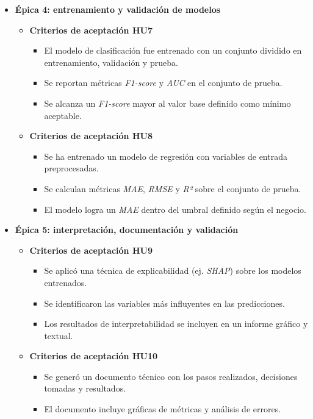 \documentclass[
11pt, %
]{charter}
\begin{document}
\begin{itemize}
  \item \textbf{Épica 4: entrenamiento y validación de modelos}
    \begin{itemize}
      \item \textbf{Criterios de aceptación HU7}
      \begin{itemize}
        \item El modelo de clasificación fue entrenado con un conjunto dividido en entrenamiento, validación y prueba.
        \item Se reportan métricas \textit{F1-score} y \textit{AUC} en el conjunto de prueba.
        \item Se alcanza un \textit{F1-score} mayor al valor base definido como mínimo aceptable.
      \end{itemize}
      \item \textbf{Criterios de aceptación HU8}
      \begin{itemize}
        \item Se ha entrenado un modelo de regresión con variables de entrada preprocesadas.
        \item Se calculan métricas \textit{MAE}, \textit{RMSE} y \textit{R²} sobre el conjunto de prueba.
        \item El modelo logra un \textit{MAE} dentro del umbral definido según el negocio.
      \end{itemize}
    \end{itemize}

  \item \textbf{Épica 5: interpretación, documentación y validación}
    \begin{itemize}
      \item \textbf{Criterios de aceptación HU9}
      \begin{itemize}
        \item Se aplicó una técnica de explicabilidad (ej. \textit{SHAP}) sobre los modelos entrenados.
        \item Se identificaron las variables más influyentes en las predicciones.
        \item Los resultados de interpretabilidad se incluyen en un informe gráfico y textual.
      \end{itemize}
      \item \textbf{Criterios de aceptación HU10}
      \begin{itemize}
        \item Se generó un documento técnico con los pasos realizados, decisiones tomadas y resultados.
        \item El documento incluye gráficas de métricas y análisis de errores.
      \end{itemize}
    \end{itemize}


\end{itemize}
\end{document}
